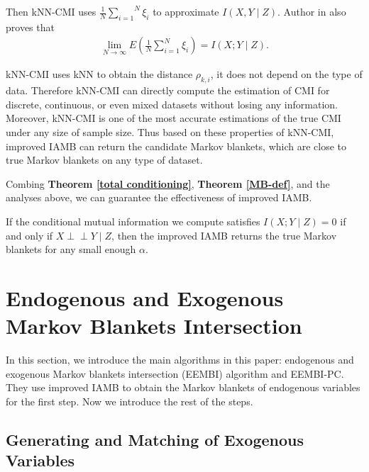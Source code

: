 \documentclass[twoside,11pt]{article}
\begin{document}
Then kNN-CMI uses $\frac1N\overset{N}{\underset{i=1}{\sum}}\xi_i$ to approximate $I(X, Y\mid Z)$. Author in \cite{mesner2020conditional} also proves that 
\begin{align*}
    \lim_{N\to\infty}E\left(\frac1N\sum^{N}_{i=1}\xi_i\right)=I(X; Y\mid Z).
\end{align*}

kNN-CMI uses kNN to obtain the distance $\rho_{k,i}$, it does not depend on the type of data. Therefore kNN-CMI can directly compute the estimation of CMI for discrete, continuous, or even mixed datasets without losing any information. Moreover, kNN-CMI is one of the most accurate estimations of the true CMI under any size of sample size. Thus based on these properties of kNN-CMI, improved IAMB can return the candidate Markov blankets, which are close to true Markov blankets on any type of dataset.

Combing \textbf{Theorem \ref{total conditioning}}, \textbf{Theorem \ref{MB-def}}, and the analyses above, we can guarantee the effectiveness of improved IAMB. 

\begin{corollary}
\label{effectiveness of improved IAMB}
If the conditional mutual information we compute satisfies $I(X; Y\mid Z)=0$ if and only if $X\perp\!\!\!\perp Y\mid Z$, then the improved IAMB returns the true Markov blankets for any small enough $\alpha$.
\end{corollary}

















\section{Endogenous and Exogenous Markov Blankets Intersection}
In this section, we introduce the main algorithms in this paper: endogenous and exogenous Markov blankets intersection (EEMBI) algorithm and EEMBI-PC. They use improved IAMB to obtain the Markov blankets of endogenous variables for the first step. Now we introduce the rest of the steps.









\subsection{Generating and Matching of Exogenous Variables}
\end{document}
